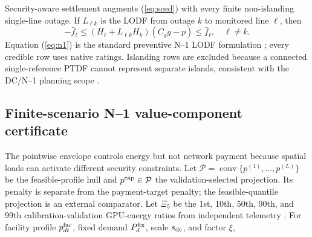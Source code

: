 \documentclass[10pt,journal]{IEEEtran}
\begin{document}
Security-aware settlement augments (\ref{eq:sced}) with every finite
non-islanding single-line outage. If $L_{\ell k}$ is the LODF from outage $k$
to monitored line $\ell$, then
\begin{equation}
 -\bar f_\ell\leq
 (H_\ell+L_{\ell k}H_k)(C_gg-p)\leq\bar f_\ell,
 \quad \ell\neq k.
 \label{eq:n1}
\end{equation}
Equation (\ref{eq:n1}) is the standard preventive N--1 LODF formulation
\cite{tejada2018lodf}; every credible row uses native ratings. Islanding rows are
excluded because a connected single-reference PTDF cannot represent separate
islands, consistent with the DC/N--1 planning scope \cite{nerc2020tpl}.

\subsection{Finite-scenario N--1 value-component certificate}

The pointwise envelope controls energy but not network payment because spatial
loads can activate different security constraints. Let $\mathcal P=\operatorname{conv}
\{p^{(1)},\ldots,p^{(L)}\}$ be the feasible-profile hull and
$p^{\rm cap}\in\mathcal P$ the validation-selected projection. Its penalty is
separate from the payment-target penalty; the feasible-quantile projection is an
external comparator. Let $\Xi_5$ be the 1st, 10th, 50th, 90th, and 99th
calibration-validation GPU-energy ratios from independent telemetry
\cite{samsi2021supercloud}. For facility profile $p^{\rm fac}_{dt}$, fixed demand
$P^{\rm fix}_d$, scale $s_{\rm dc}$, and factor $\xi$,
\end{document}

